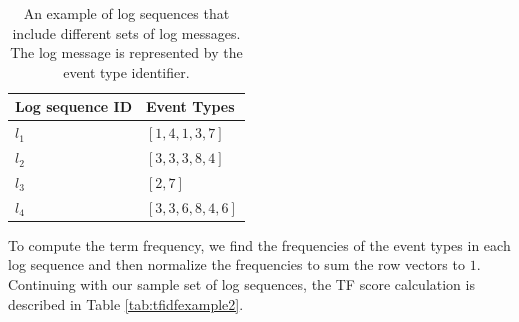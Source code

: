 \begin{table}
\centering
\begin{tabular}{@{}C{10cm}C{10cm}@{}}
\toprule
\textbf{Log sequence ID} & \textbf{Event Types} \\ \midrule
$l_1$                       & {$[1, 4, 1, 3, 7]$}               \\
$l_2$                         & {$[3, 3, 3, 8, 4]$}               \\
$l_3$                         & {$[2, 7]$}               \\
$l_4$                         & {$[3, 3, 6, 8, 4, 6]$}               \\ \bottomrule
\end{tabular}
\caption{An example of log sequences that include different sets of log messages. The log message is represented by the event type identifier.}\label{tab:tfidfexample1}
\end{table}

To compute the term frequency, we find the frequencies of the event types in each log sequence and then normalize the frequencies to sum the row vectors to $1$. Continuing with our sample set of log sequences, the TF score calculation is described in Table \ref{tab:tfidfexample2}.

